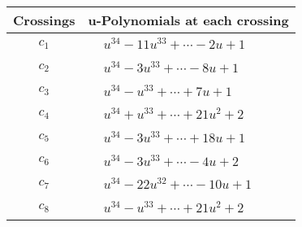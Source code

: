 \documentclass[1p]{elsarticle_modified}
\theoremstyle{definition}
\begin{document}
\begin{tabular}{m{50pt}|m{274pt}}
Crossings & \hspace{64pt}u-Polynomials at each crossing \\
\hline $$\begin{aligned}c_{1}\end{aligned}$$&$\begin{aligned}
&u^{34}-11 u^{33}+\cdots-2 u+1
\end{aligned}$\\
\hline $$\begin{aligned}c_{2}\end{aligned}$$&$\begin{aligned}
&u^{34}-3 u^{33}+\cdots-8 u+1
\end{aligned}$\\
\hline $$\begin{aligned}c_{3}\end{aligned}$$&$\begin{aligned}
&u^{34}- u^{33}+\cdots+7 u+1
\end{aligned}$\\
\hline $$\begin{aligned}c_{4}\end{aligned}$$&$\begin{aligned}
&u^{34}+u^{33}+\cdots+21 u^2+2
\end{aligned}$\\
\hline $$\begin{aligned}c_{5}\end{aligned}$$&$\begin{aligned}
&u^{34}-3 u^{33}+\cdots+18 u+1
\end{aligned}$\\
\hline $$\begin{aligned}c_{6}\end{aligned}$$&$\begin{aligned}
&u^{34}-3 u^{33}+\cdots-4 u+2
\end{aligned}$\\
\hline $$\begin{aligned}c_{7}\end{aligned}$$&$\begin{aligned}
&u^{34}-22 u^{32}+\cdots-10 u+1
\end{aligned}$\\
\hline $$\begin{aligned}c_{8}\end{aligned}$$&$\begin{aligned}
&u^{34}- u^{33}+\cdots+21 u^2+2
\end{aligned}$\\

\end{tabular}
\end{document}
